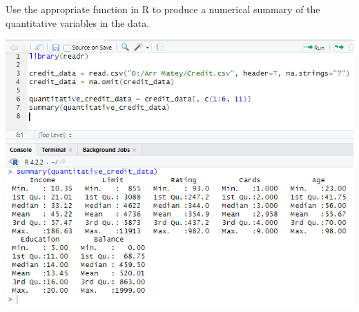 Use the appropriate function in R to produce a numerical summary of the quantitative variables in the
data.

\noindent \includegraphics[width=6in]{r_1a.PNG}